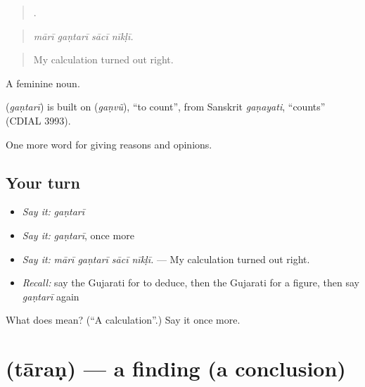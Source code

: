 \begin{quote}
   .
\end{quote}

\begin{quote}
\emph{mārī gaṇtarī sācī nīkḷī.}
\end{quote}

\begin{quote}
My calculation turned out right.
\end{quote}

A feminine noun.

\begin{cousinweb}
\textbf{} (\emph{gaṇtarī}) is built on \textbf{} (\emph{gaṇvũ}), \textquotedblleft{}to count\textquotedblright{}, from Sanskrit \emph{gaṇayati}, \textquotedblleft{}counts\textquotedblright{} (CDIAL 3993).
\end{cousinweb}

\begin{grammarlens}[title={What you've built}]
One more word for giving reasons and opinions.
\end{grammarlens}

\subsection*{Your turn}
\begin{itemize}
\raggedright
  \item \emph{Say it:} \emph{gaṇtarī}
  \item \emph{Say it:} \emph{gaṇtarī}, once more
  \item \emph{Say it:} \emph{mārī gaṇtarī sācī nīkḷī.} — My calculation turned out right.
  \item \emph{Recall:} say the Gujarati for to deduce, then the Gujarati for a figure, then say \emph{gaṇtarī} again
\end{itemize}

\begin{tcolorbox}[breakable,colback=teal!4,colframe=teal!35!black,title={Before you move on}]
What does  mean? (\textquotedblleft{}A calculation\textquotedblright{}.) Say it once more.
\end{tcolorbox}
\section[\texorpdfstring{\gu{તારણ} (tāraṇ)}{તારણ (tāraṇ)}]{ (tāraṇ) — a finding (a conclusion)}

